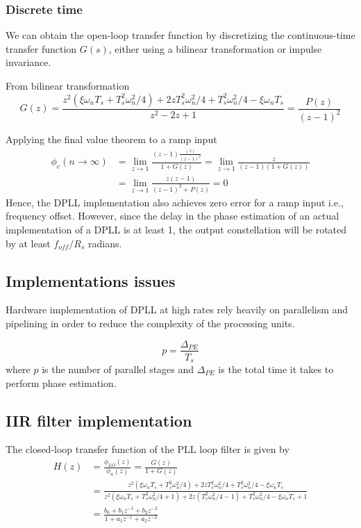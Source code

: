 \documentclass[a4paper]{article}
\begin{document}
\subsubsection{Discrete time}

We can obtain the open-loop transfer function by discretizing the continuous-time transfer function $G(s)$, either using a bilinear transformation or impulse invariance.

From bilinear transformation
\begin{equation}
G(z) = \frac{z^2(\xi\omega_nT_s + T_s^2\omega_n^2/4) + 2zT_s^2\omega_n^2/4 + T_s^2\omega_n^2/4 - \xi\omega_nT_s}{z^2 - 2z + 1} = \frac{P(z)}{(z-1)^2}
\end{equation}

Applying the final value theorem to a ramp input
\begin{align} \nonumber
\phi_e(n\to\infty) &= \lim_{z\to 1} \frac{(z-1)\frac{(z)}{(z-1)^2}}{1 + G(z)} = \lim_{z\to 1} \frac{z}{(z-1)(1 + G(z))} \\
&= \lim_{z\to 1} \frac{z(z-1)}{(z-1)^2 + P(z)} = 0
\end{align}
Hence, the DPLL implementation also achieves zero error for a ramp input i.e., frequency offset. However, since the delay in the phase estimation of an actual implementation of a DPLL is at least 1, the output constellation will be rotated by at least $f_{off}/R_s$ radians.

\subsection{Implementations issues}
Hardware implementation of DPLL at high rates rely heavily on parallelism and pipelining in order to reduce the complexity of the processing units. 

\begin{equation}
p = \frac{\Delta_{PE}}{T_s}
\end{equation}
where $p$ is the number of parallel stages and $\Delta_{PE}$ is the total time it takes to perform phase estimation.

\subsection{IIR filter implementation}
The closed-loop transfer function of the PLL loop filter is given by
\begin{align} \nonumber
H(z) &= \frac{\phi_{LO}(z)}{\phi_n(z)} = \frac{G(z)}{1 + G(z)} \\ \nonumber
&= \frac{z^2(\xi\omega_nT_s + T_s^2\omega_n^2/4) + 2zT_s^2\omega_n^2/4 + T_s^2\omega_n^2/4 - \xi\omega_nT_s}{z^2(\xi\omega_nT_s + T_s^2\omega_n^2/4 + 1) + 2z(T_s^2\omega_n^2/4-1) + T_s^2\omega_n^2/4 - \xi\omega_nT_s + 1} \\
& = \frac{b_0 + b_1z^{-1} + b_2z^{-2}}{1 + a_1z^{-1} + a_2z^{-2}}
\end{align}
\end{document}
